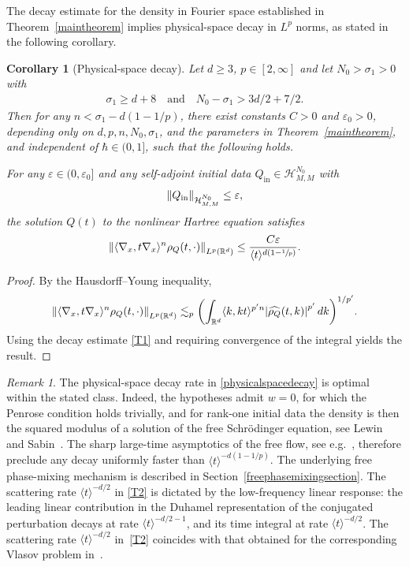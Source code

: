 \documentclass[10pt,a4paper]{amsart}
\providecommand{\eg}{e.g.\ }
\theoremstyle{plain}
\newtheorem{corollary}[theorem]{Corollary}
\theoremstyle{remark}
\newtheorem{remark}[theorem]{Remark}
\newcommand{\bbbr}[1]{\biggl(#1 \biggr)}
\newcommand{\jb}[1]{\langle#1\rangle}
\newcommand{\qaq}{\quad\text{and}\quad}
\newcommand{\ep}{\varepsilon}
\newcommand{\R}{\mathbb{R}}
\newcommand{\Qin}{Q_{\mathrm{in}}}
\begin{document}
The decay estimate for the density in Fourier space established in Theorem~\ref{maintheorem} implies physical-space decay in $L^p$ norms, as stated in the following corollary.
\begin{corollary}[Physical-space decay]
Let $d\geq 3$, $p\in[2,\infty]$ and let $N_0>\sigma_1>0$ with
\begin{align*}
\sigma_1\geq d+8\qaq N_0-\sigma_1>3d/2+7/2.
\end{align*}
Then for any $n<\sigma_1-d(1-1/p)$, there exist constants $C>0$ and $\ep_0>0$, depending only on $d,p,n,N_0,\sigma_1$, and the parameters in Theorem~\ref{maintheorem}, and independent of $\hbar\in(0,1]$, such that the following holds.

For any $\ep\in(0,\ep_0]$ and any self-adjoint initial data $\Qin\in\mathcal{H}^{N_0}_{M,M}$ with
\begin{align*}
\norm{Q_{\mathrm{in}}}_{\mathcal H^{N_0}_{M,M}}\leq\ep,
\end{align*}
the solution $Q(t)$ to the nonlinear Hartree equation satisfies
\begin{align}\label{physicalspacedecay}
\norm{\jb{\nabla_x,t\nabla_x}^n\rho_Q(t,\cdot)}_{L^p(\R^d)}\leq \frac{C\ep}{\jb{ t}^{d(1-\sfrac{1}{p})}}.
\end{align}
\end{corollary}
\begin{proof}
By the Hausdorff--Young inequality,
\begin{align*}
\norm{\jb{\nabla_x,t\nabla_x}^n\rho_Q(t,\cdot)}_{L^p(\R^d)}
\lesssim_p \bbbr{\int_{\R^d} \jb{k,kt}^{p'n} \abs{\widehat{\rho_Q}(t,k)}^{p'} \,dk}^{1/p'}.
\end{align*}
Using the decay estimate \eqref{T1} and requiring convergence of the integral yields the result.
\end{proof}

\begin{remark}\label{optimalityremark}
The physical-space decay rate in \eqref{physicalspacedecay} is optimal within the stated class. Indeed, the hypotheses admit $w=0$, for which the Penrose condition holds trivially, and for rank-one initial data the density is then the squared modulus of a solution of the free Schrödinger equation, see Lewin and Sabin~\cite{LewinSabinI2015}. The sharp large-time asymptotics of the free flow, see \eg \cite[Ch.\,2]{Cazenave2003}, therefore preclude any decay uniformly faster than $\jb{t}^{-d(1-1/p)}$. The underlying free phase-mixing mechanism is described in Section~\ref{freephasemixingsection}. The scattering rate $\jb{t}^{-d/2}$ in \eqref{T2} is dictated by the low-frequency linear response: the leading linear contribution in the Duhamel representation of the conjugated perturbation decays at rate $\jb{t}^{-d/2-1}$, and its time integral at rate $\jb{t}^{-d/2}$. The scattering rate $\jb{t}^{-d/2}$ in~\eqref{T2} coincides with that obtained for the corresponding Vlasov problem in~\cite{BedrossianMasmoudiMouhot2018}.
\end{remark}
\end{document}

